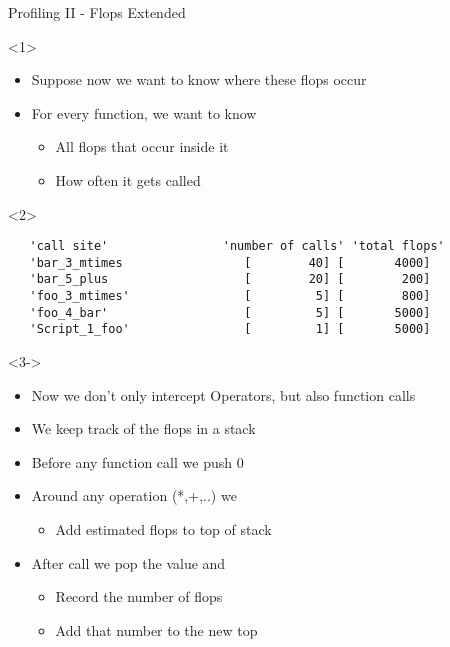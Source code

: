 \begin{frame}[fragile]{Profiling II - Flops Extended}
  \begin{onlyenv}<1>
    \begin{itemize}
    \item Suppose now we want to know where these flops occur
    \item For every function, we want to know
      \begin{itemize}
      \item All flops that occur inside it
      \item How often it gets called
      \end{itemize}
    \end{itemize}
  \end{onlyenv}
  \begin{onlyenv}<2>
\begin{Verbatim}
   'call site'                'number of calls' 'total flops'
   'bar_3_mtimes                 [        40] [       4000]
   'bar_5_plus                   [        20] [        200]
   'foo_3_mtimes'                [         5] [        800]
   'foo_4_bar'                   [         5] [       5000]
   'Script_1_foo'                [         1] [       5000]
\end{Verbatim}
  \end{onlyenv}
  \begin{onlyenv}<3->
    \begin{itemize}
    \pause
    \pause \item Now we don't only intercept Operators, but also function calls
    \pause \item We keep track of the flops in a stack
    \pause \item Before any function call we push 0
    \pause \item Around any operation (*,+,..) we
      \begin{itemize}
      \item Add estimated flops to top of stack
      \end{itemize}
    \pause \item After call we pop the value and
      \begin{itemize}
      \item Record the number of flops
      \item Add that number to the new top
      \end{itemize}    
    \end{itemize}
  \end{onlyenv}
\end{frame}


